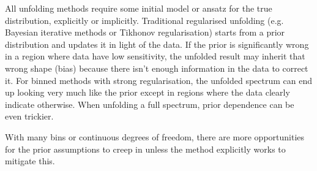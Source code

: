         All unfolding methods require some initial model or ansatz for the true distribution, explicitly or implicitly.
        Traditional regularised unfolding (e.g. Bayesian iterative methods or Tikhonov regularisation) starts from a prior distribution and updates it in light of the data.
        If the prior is significantly wrong in a region where data have low sensitivity, the unfolded result may inherit that wrong shape (bias) because there isn't enough information in the data to correct it.
        For binned methods with strong regularisation, the unfolded spectrum can end up looking very much like the prior except in regions where the data clearly indicate otherwise.
        When unfolding a full spectrum, prior dependence can be even trickier.
        
        With many bins or continuous degrees of freedom, there are more opportunities for the prior assumptions to creep in unless the method explicitly works to mitigate this.
